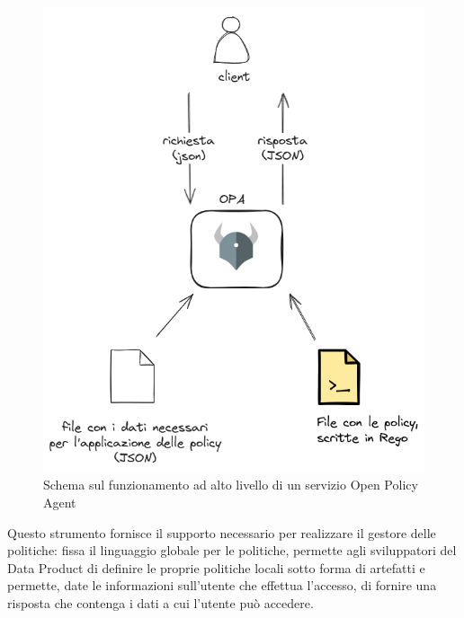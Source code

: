 \documentclass[12pt]{report}
\begin{document}
\begin{figure}[H]
    \centering
    \includegraphics[width=\linewidth]{immagini/Opa funzionamento.png}
    \caption{Schema sul funzionamento ad alto livello di un servizio Open Policy Agent}
    \label{OPA image}
\end{figure}
Questo strumento fornisce il supporto necessario per realizzare il gestore delle politiche: fissa il linguaggio globale per le politiche, permette agli sviluppatori del Data Product di definire le proprie politiche locali sotto forma di artefatti e permette, date le informazioni sull'utente che effettua l'accesso, di fornire una risposta che contenga i dati a cui l'utente può accedere.
\end{document}
